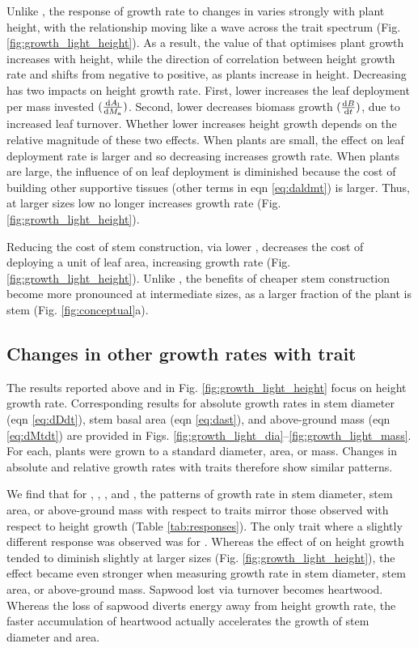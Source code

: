\documentclass[9pt,twocolumn,twoside,lineno]{pnas-new}
\begin{document}
Unlike {\nitrogen}, the response of growth rate to changes in {\lma} varies strongly with plant height, with the relationship moving like a wave across the trait spectrum (Fig. \ref{fig:growth_light_height}). As a result, the value of {\lma} that optimises plant growth increases with height, while the direction of correlation between height growth rate and {\lma} shifts from negative to positive, as plants increase in height. Decreasing {\lma} has two impacts on height growth rate. First, lower {\lma} increases the leaf deployment per mass invested $(\frac{{\rm d}A_{\rm l}}{{\rm d}M_{\rm a}})$. Second, lower {\lma} decreases biomass growth $(\frac{{\rm d}B}{{\rm d}t})$, due to increased leaf turnover. Whether lower {\lma} increases height growth depends on the relative magnitude of these two effects. When plants are small, the effect on leaf deployment rate is larger and so decreasing {\lma} increases growth rate. When plants are large, the influence of {\lma} on leaf deployment is diminished because the cost of building other supportive tissues (other terms in eqn \ref{eq:daldmt}) is larger. Thus, at larger sizes low {\lma} no longer increases growth rate (Fig. \ref{fig:growth_light_height}).

Reducing the cost of stem construction, via lower {\wood}, decreases the cost of deploying a unit of leaf area, increasing growth rate (Fig. \ref{fig:growth_light_height}). Unlike {\lma}, the benefits of cheaper stem construction become more pronounced at intermediate sizes, as a larger fraction of the plant is stem (Fig. \ref{fig:conceptual}a).

\subsection{Changes in other growth rates with trait}

The results reported above and in Fig. \ref{fig:growth_light_height} focus on height growth rate. Corresponding results for absolute growth rates in stem diameter (eqn \ref{eq:dDdt}), stem basal area (eqn \ref{eq:dast}), and above-ground mass (eqn \ref{eq:dMtdt}) are provided in Figs. \ref{fig:growth_light_dia}--\ref{fig:growth_light_mass}. For each, plants were grown to a standard diameter, area, or mass. Changes in absolute and relative growth rates with traits therefore show similar patterns.

We find that for {\seed}, {\nitrogen}, {\lma}, and {\hmat}, the patterns of growth rate in stem diameter, stem area, or above-ground mass with respect to traits mirror those observed with respect to height growth (Table \ref{tab:responses}). The only trait where a slightly different response was observed was for {\wood}. Whereas the effect of {\wood} on height growth tended to diminish slightly at larger sizes (Fig. \ref{fig:growth_light_height}), the effect became even stronger when measuring growth rate in stem diameter, stem area, or above-ground mass. Sapwood lost via turnover becomes heartwood. Whereas the loss of sapwood diverts energy away from height growth rate, the faster accumulation of heartwood actually accelerates the growth of stem diameter and area.
\end{document}
